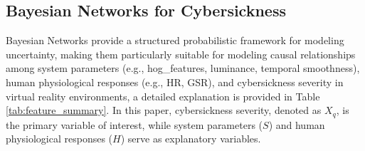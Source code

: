 \documentclass{vgtc}                          %
\begin{document}




\subsection{Bayesian Networks for Cybersickness} \label{sec:BN}
Bayesian Networks provide a structured probabilistic framework for modeling uncertainty, making them particularly suitable for modeling causal relationships among system parameters (e.g., hog\_features, luminance, temporal smoothness), human physiological responses (e.g., HR, GSR), and cybersickness severity in virtual reality environments, a detailed explanation is provided in Table \ref{tab:feature_summary}. In this paper, cybersickness severity, denoted as \(X_q\), is the primary variable of interest, while system parameters (\(S\)) and human physiological responses (\(H\)) serve as explanatory variables.
\end{document}
